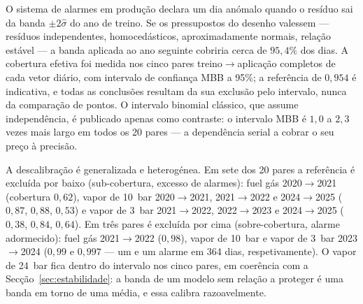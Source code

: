 O sistema de alarmes em produção declara um dia anómalo quando o resíduo sai
da banda $\pm 2\hat\sigma$ do ano de treino. Se os pressupostos do desenho
valessem --- resíduos independentes, homocedásticos, aproximadamente normais,
relação estável --- a banda aplicada ao ano seguinte cobriria cerca de
$95{,}4\%$ dos dias. A cobertura efetiva foi medida nos cinco pares
treino${\to}$aplicação completos de cada vetor diário, com intervalo de
confiança MBB a 95\%; a referência de $0{,}954$ é indicativa, e todas as
conclusões resultam da sua exclusão pelo intervalo, nunca da comparação de
pontos. O intervalo binomial clássico, que assume independência, é publicado
apenas como contraste: o intervalo MBB é $1{,}0$ a $2{,}3$ vezes mais largo em
todos os 20 pares --- a dependência serial a cobrar o seu preço à precisão.

A descalibração é generalizada e heterogénea. Em sete dos 20 pares a
referência é excluída por baixo (sub-cobertura, excesso de alarmes): fuel gás
2020${\to}$2021 (cobertura $0{,}62$), vapor de 10~bar 2020${\to}$2021,
2021${\to}$2022 e 2024${\to}$2025 ($0{,}87$, $0{,}88$, $0{,}53$) e vapor de
3~bar 2021${\to}$2022, 2022${\to}$2023 e 2024${\to}$2025 ($0{,}38$, $0{,}84$,
$0{,}64$). Em três pares é excluída por cima (sobre-cobertura, alarme
adormecido): fuel gás 2021${\to}$2022 ($0{,}98$), vapor de 10~bar e vapor de
3~bar 2023${\to}$2024 ($0{,}99$ e $0{,}997$ --- um e um alarme em 364 dias,
respetivamente). O vapor de 24~bar fica dentro do intervalo nos cinco pares,
em coerência com a Secção~\ref{sec:estabilidade}: a banda de um modelo sem
relação a proteger é uma banda em torno de uma média, e essa calibra
razoavelmente.

